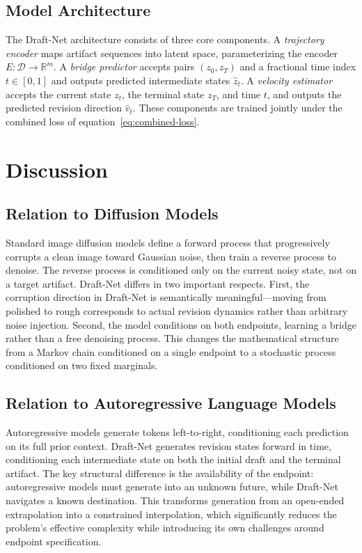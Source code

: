 \documentclass[12pt,a4paper]{article}
\theoremstyle{draftthm}
\newcommand{\D}{\mathcal{D}}
\newcommand{\Lat}{\mathbb{R}^{m}}
\newcommand{\enc}{E}
\begin{document}
\subsection{Model Architecture}

The Draft-Net architecture consists of three core components. A \emph{trajectory encoder} maps artifact sequences into latent space, parameterizing the encoder $\enc: \D \to \Lat$. A \emph{bridge predictor} accepts pairs $(z_0, z_T)$ and a fractional time index $t \in [0,1]$ and outputs predicted intermediate states $\hat{z}_t$. A \emph{velocity estimator} accepts the current state $z_t$, the terminal state $z_T$, and time $t$, and outputs the predicted revision direction $\hat{v}_t$. These components are trained jointly under the combined loss of equation~\eqref{eq:combined-loss}.

\section{Discussion}

\subsection{Relation to Diffusion Models}

Standard image diffusion models define a forward process that progressively corrupts a clean image toward Gaussian noise, then train a reverse process to denoise. The reverse process is conditioned only on the current noisy state, not on a target artifact. Draft-Net differs in two important respects. First, the corruption direction in Draft-Net is semantically meaningful---moving from polished to rough corresponds to actual revision dynamics rather than arbitrary noise injection. Second, the model conditions on both endpoints, learning a bridge rather than a free denoising process. This changes the mathematical structure from a Markov chain conditioned on a single endpoint to a stochastic process conditioned on two fixed marginals.

\subsection{Relation to Autoregressive Language Models}

Autoregressive models generate tokens left-to-right, conditioning each prediction on its full prior context. Draft-Net generates revision states forward in time, conditioning each intermediate state on both the initial draft and the terminal artifact. The key structural difference is the availability of the endpoint: autoregressive models must generate into an unknown future, while Draft-Net navigates a known destination. This transforms generation from an open-ended extrapolation into a constrained interpolation, which significantly reduces the problem's effective complexity while introducing its own challenges around endpoint specification.
\end{document}
